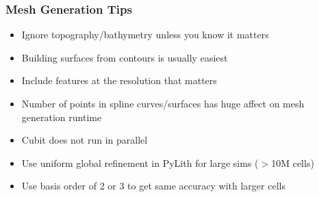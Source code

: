 \documentclass[aspectratio=169]{beamer}
\begin{document}
\begin{frame}
  \frametitle{Mesh Generation Tips}

  \begin{itemize}
    \begin{itemize}
    \item Ignore topography/bathymetry unless you know it matters
    \end{itemize}
    \begin{itemize}
    \item Building surfaces from contours is usually easiest
    \item Include features at the resolution that matters
    \end{itemize}
    \begin{itemize}
    \item Number of points in spline curves/surfaces has huge affect on mesh generation runtime
    \item Cubit does not run in parallel
    \item Use uniform global refinement in PyLith for large sims ($>$10M cells)
    \item Use basis order of 2 or 3 to get same accuracy with larger cells
    \end{itemize}
  \end{itemize}

\end{frame}
\end{document}
